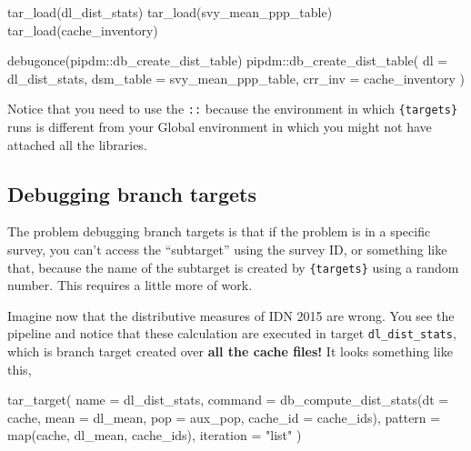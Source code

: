 \documentclass[
]{book}
\newenvironment{Shaded}{\begin{snugshade}}{\end{snugshade}}
\newcommand{\AttributeTok}[1]{\textcolor[rgb]{0.77,0.63,0.00}{#1}}
\newcommand{\FunctionTok}[1]{\textcolor[rgb]{0.00,0.00,0.00}{#1}}
\newcommand{\NormalTok}[1]{#1}
\newcommand{\SpecialCharTok}[1]{\textcolor[rgb]{0.00,0.00,0.00}{#1}}
\newcommand{\StringTok}[1]{\textcolor[rgb]{0.31,0.60,0.02}{#1}}
\begin{document}
\begin{Shaded}
\begin{Highlighting}[]

\FunctionTok{tar\_load}\NormalTok{(dl\_dist\_stats)}
\FunctionTok{tar\_load}\NormalTok{(svy\_mean\_ppp\_table)}
\FunctionTok{tar\_load}\NormalTok{(cache\_inventory)}

\FunctionTok{debugonce}\NormalTok{(pipdm}\SpecialCharTok{::}\NormalTok{db\_create\_dist\_table)}
\NormalTok{pipdm}\SpecialCharTok{::}\FunctionTok{db\_create\_dist\_table}\NormalTok{(}
  \AttributeTok{dl        =}\NormalTok{ dl\_dist\_stats,}
  \AttributeTok{dsm\_table =}\NormalTok{ svy\_mean\_ppp\_table, }
  \AttributeTok{crr\_inv   =}\NormalTok{ cache\_inventory}
\NormalTok{  )}
\end{Highlighting}
\end{Shaded}

Notice that you need to use the \texttt{::} because the environment in which
\texttt{\{targets\}} runs is different from your Global environment in which you might
not have attached all the libraries.

\hypertarget{debugging-branch-targets}{%
\subsection*{Debugging branch targets}\label{debugging-branch-targets}}

The problem debugging branch targets is that if the problem is in a specific
survey, you can't access the ``subtarget'' using the survey ID, or something like
that, because the name of the subtarget is created by \texttt{\{targets\}} using a random
number. This requires a little more of work.

Imagine now that the distributive measures of IDN 2015 are wrong. You see the
pipeline and notice that these calculation are executed in target
\texttt{dl\_dist\_stats}, which is branch target created over \textbf{all the cache files!} It
looks something like this,

\begin{Shaded}
\begin{Highlighting}[]
\FunctionTok{tar\_target}\NormalTok{(}
  \AttributeTok{name      =}\NormalTok{ dl\_dist\_stats,}
  \AttributeTok{command   =} \FunctionTok{db\_compute\_dist\_stats}\NormalTok{(}\AttributeTok{dt       =}\NormalTok{ cache, }
                                    \AttributeTok{mean     =}\NormalTok{ dl\_mean, }
                                    \AttributeTok{pop      =}\NormalTok{ aux\_pop, }
                                    \AttributeTok{cache\_id =}\NormalTok{ cache\_ids), }
  \AttributeTok{pattern   =}  \FunctionTok{map}\NormalTok{(cache, dl\_mean, cache\_ids), }
  \AttributeTok{iteration =} \StringTok{"list"}
\NormalTok{)}
\end{Highlighting}
\end{Shaded}
\end{document}
